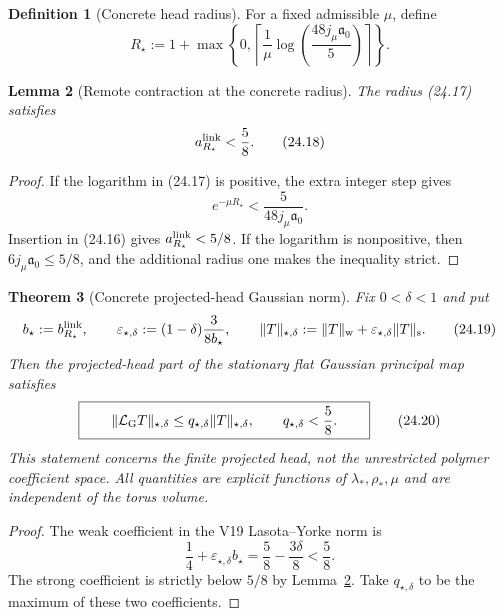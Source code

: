 \documentclass[11pt,oneside]{book}
\newtheorem{theorem}{Theorem}[chapter]
\newtheorem{lemma}[theorem]{Lemma}
\theoremstyle{definition}
\newtheorem{definition}[theorem]{Definition}
\theoremstyle{remark}
\begin{document}
\begin{definition}[Concrete head radius]
\label{def:e8v24-radius}
For a fixed admissible \(\mu\), define
\[
\boxed{\quad
R_\star:=
1+\max\left\{0,
\left\lceil
\frac1\mu\log\left(\frac{48j_\mu\mathfrak a_0}{5}\right)
\right\rceil
\right\}.
\quad}                                             \tag{24.17}
\]
\end{definition}

\begin{lemma}[Remote contraction at the concrete radius]
\label{lem:e8v24-tail}
The radius (24.17) satisfies
\[
                         a_{R_\star}^{\rm link}<\frac58.           \tag{24.18}
\]
\end{lemma}

\begin{proof}
If the logarithm in (24.17) is positive, the extra integer step gives
\[
e^{-\mu R_\star}
<\frac{5}{48j_\mu\mathfrak a_0}.
\]
Insertion in (24.16) gives \(a_{R_\star}^{\rm link}<5/8\).
If the logarithm is nonpositive, then
\(6j_\mu\mathfrak a_0\leq5/8\), and the additional radius one makes
the inequality strict.
\end{proof}

\begin{theorem}[Concrete projected-head Gaussian norm]
\label{thm:e8v24-concrete-norm}
Fix \(0<\delta<1\) and put
\[
 b_\star:=b_{R_\star}^{\rm link},\qquad
\varepsilon_{\star,\delta}:=(1-\delta)\frac{3}{8b_\star},\qquad
\|T\|_{\star,\delta}:=\|T\|_{\rm w}
 +\varepsilon_{\star,\delta}\|T\|_{\rm s}.         \tag{24.19}
\]
Then the projected-head part of the stationary flat Gaussian principal
map satisfies
\[
\boxed{\qquad
\|\mathcal L_{\rm G}T\|_{\star,\delta}
\leq q_{\star,\delta}\|T\|_{\star,\delta},\qquad
q_{\star,\delta}<\frac58.
\qquad}                                            \tag{24.20}
\]
This statement concerns the finite projected head, not the unrestricted
polymer coefficient space.  All quantities are explicit functions of
\(\lambda_*,\rho_*,\mu\) and are independent of the torus volume.
\end{theorem}

\begin{proof}
The weak coefficient in the V19 Lasota--Yorke norm is
\[
\frac14+\varepsilon_{\star,\delta} b_\star
=\frac58-\frac{3\delta}{8}<\frac58.
\]
The strong coefficient is strictly below \(5/8\) by
Lemma~\ref{lem:e8v24-tail}.  Take \(q_{\star,\delta}\) to be the
maximum of these two coefficients.
\end{proof}
\end{document}
